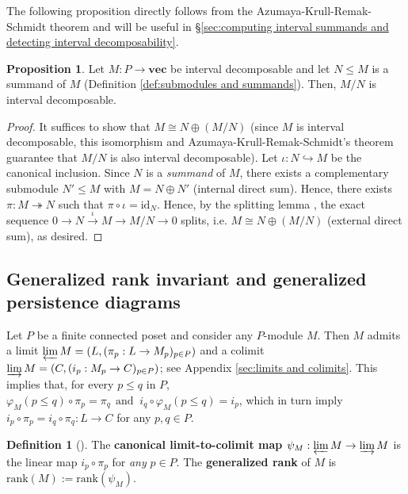 \documentclass[11pt]{article}
\theoremstyle{definition}
\newtheorem{proposition}[theorem]{Proposition}
\newtheorem{definition}[theorem]{Definition}
\newcommand{\rank}{\mathrm{rank}}
\newcommand{\id}{\mathrm{id}}
\newcommand{\Pb}{P}
\newcommand{\vect}{\mathbf{vec}}
\begin{document}
The following proposition directly follows from the Azumaya-Krull-Remak-Schmidt theorem and will be useful  
in \S\ref{sec:computing interval summands and detecting interval decomposability}. 

\begin{proposition}\label{prop:quotienting does not change interver decomposabilty}
Let $M:\Pb\rightarrow \vect$ be interval decomposable and let $N\leq M$ is a summand of $M$ (Definition \ref{def:submodules and summands}). Then, $M/N$ is interval decomposable. 
\end{proposition}


\begin{proof} It suffices to show that $M\cong N\oplus (M/N)$ (since $M$ is interval decomposable, this isomorphism and Azumaya-Krull-Remak-Schmidt's theorem \cite{azumaya1950corrections} guarantee that $M/N$ is also interval decomposable).
Let $\iota:N\hookrightarrow M$ be the canonical inclusion. Since $N$ is a \emph{summand} of $M$, there exists a complementary submodule $N'\leq M$ with $M=N\oplus N'$  (internal direct sum). Hence, there exists $\pi:M\twoheadrightarrow N$ such that $\pi\circ \iota=\id_N$. Hence, by the splitting lemma \cite[Theorem 23.1]{munkres2018elements}, the exact sequence $0\rightarrow N \stackrel{\iota}{\rightarrow} M \rightarrow M/N \rightarrow 0$ splits, i.e. $M\cong N\oplus (M/N)$ (external direct sum), as desired.
\end{proof}


\subsection{Generalized rank invariant and generalized persistence diagrams }\label{sec:generalized rank invariant}

Let $\Pb$ be a finite connected poset and consider any $\Pb$-module $M$. Then $M$ admits a limit  $\varprojlim M=(L, (\pi_p:L\rightarrow M_p)_{p\in \Pb})$ and a colimit $\varinjlim M =(C, (i_p:M_p\rightarrow C)_{p\in \Pb})$; see Appendix \ref{sec:limits and colimits}. This implies that, for every $p\leq q$ in $\Pb$, $\varphi_M(p\leq q)\circ \pi_p =\pi_q\ \ \mbox{and }\  i_q\circ \varphi_M(p\leq q) =i_p$, which in turn imply $i_p \circ \pi_p=i_q \circ \pi_q:L\rightarrow C$ for any $p,q\in \Pb$. 



\begin{definition}[{\cite{kim2018generalized}}]\label{def:rank}
The \textbf{canonical limit-to-colimit map $\psi_M:\varprojlim M\rightarrow \varinjlim M$} is the linear map $i_p\circ \pi_p$ for \emph{any} $p\in \Pb$. The \textbf{generalized rank} of $M$ is $\rank(M):=\rank(\psi_M)$. 
\end{definition}
\end{document}
